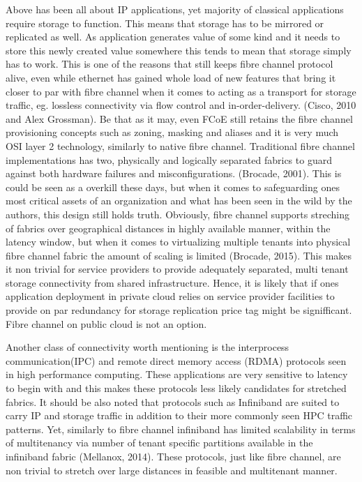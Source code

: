 \documentclass{article}
\begin{document}
Above has been all about IP applications, yet majority of classical applications require storage to function. This means that storage has to be mirrored or replicated as well. As application generates value of some kind and it needs to store this newly created value somewhere this tends to mean that storage simply has to work. This is one of the reasons that still keeps fibre channel protocol alive, even while ethernet has gained whole load of new features that bring it closer to par with fibre channel when it comes to acting as a transport for storage traffic, eg. lossless connectivity via flow control and in-order-delivery. (Cisco, 2010 and Alex Grossman). Be that as it may, even FCoE still retains the fibre channel provisioning concepts such as zoning, masking and aliases and it is very much OSI layer 2 technology, similarly to native fibre channel. Traditional fibre channel implementations has two, physically and logically separated fabrics to guard against both hardware failures and misconfigurations. (Brocade, 2001). This is could be seen as a overkill these days, but when it comes to safeguarding ones most critical assets of an organization and what has been seen in the wild by the authors, this design still holds truth. Obviously, fibre channel supports streching of fabrics over geographical distances in highly available manner, within the latency window, but when it comes to virtualizing multiple tenants into physical fibre channel fabric the amount of scaling is limited (Brocade, 2015). This makes it non trivial for service providers to provide adequately separated, multi tenant storage connectivity from shared infrastructure. Hence, it is likely that if ones application deployment in private cloud relies on service provider facilities to provide on par redundancy for storage replication price tag might be signifficant. Fibre channel on public cloud is not an option.
\par
Another class of connectivity worth mentioning is the interprocess communication(IPC) and remote direct memory access (RDMA) protocols seen in high performance computing. These applications are very sensitive to latency to begin with and this makes these protocols less likely candidates for stretched fabrics. It should be also noted that protocols such as Infiniband are suited to carry IP and storage traffic in addition to their more commonly seen HPC traffic patterns. Yet, similarly to fibre channel infiniband has limited scalability in terms of multitenancy via number of tenant specific partitions available in the infiniband fabric (Mellanox, 2014). These protocols, just like fibre channel, are non trivial to stretch over large distances in feasible and multitenant manner.
\end{document}
